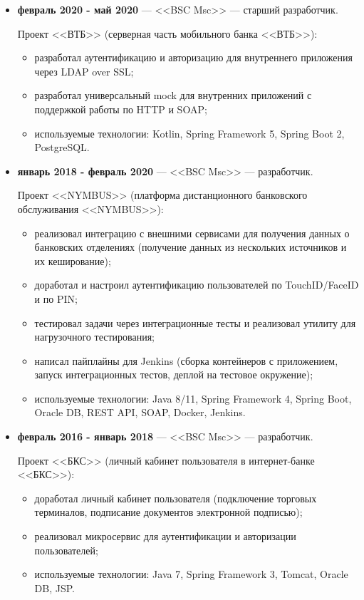 \documentclass{article}
\begin{document}
\normalsize{

\begin{itemize}

	\item \textbf{февраль 2020 - май 2020} --- <<BSC Msc>> --- старший разработчик.

	Проект <<ВТБ>> (серверная часть мобильного банка <<ВТБ>>):

	\begin{itemize}		
		\item разработал аутентификацию и авторизацию для внутреннего приложения через LDAP over SSL;
		\item разработал универсальный mock для внутренних приложений с поддержкой работы по HTTP и SOAP;
		\item используемые технологии: Kotlin, Spring Framework 5, Spring Boot 2, PostgreSQL.
	\end{itemize}

	\item \textbf{январь 2018 - февраль 2020} --- <<BSC Msc>> --- разработчик.

	Проект <<NYMBUS>> (платформа дистанционного банковского обслуживания <<NYMBUS>>):

	\begin{itemize}		
		\item реализовал интеграцию с внешними сервисами для получения данных о банковских отделениях (получение данных из нескольких источников и их кеширование);
		\item доработал и настроил аутентификацию пользователей по TouchID/FaceID и по PIN;
		\item тестировал задачи через интеграционные тесты и реализовал утилиту для нагрузочного тестирования;
		\item написал пайплайны для Jenkins (сборка контейнеров с приложением, запуск интеграционных тестов, деплой на тестовое окружение);
		\item используемые технологии: Java 8/11, Spring Framework 4, Spring Boot, Oracle DB, REST API, SOAP, Docker, Jenkins.
	\end{itemize}

	\item \textbf{февраль 2016 - январь 2018} --- <<BSC Msc>> --- разработчик.

	Проект <<БКС>> (личный кабинет пользователя в интернет-банке <<БКС>>):

	\begin{itemize}		
		\item доработал личный кабинет пользователя (подключение торговых терминалов, подписание документов электронной подписью);
		\item реализовал микросервис для аутентификации и авторизации пользователей;
		\item используемые технологии: Java 7, Spring Framework 3, Tomcat, Oracle DB, JSP.
	\end{itemize}


\end{itemize}}
\end{document}
